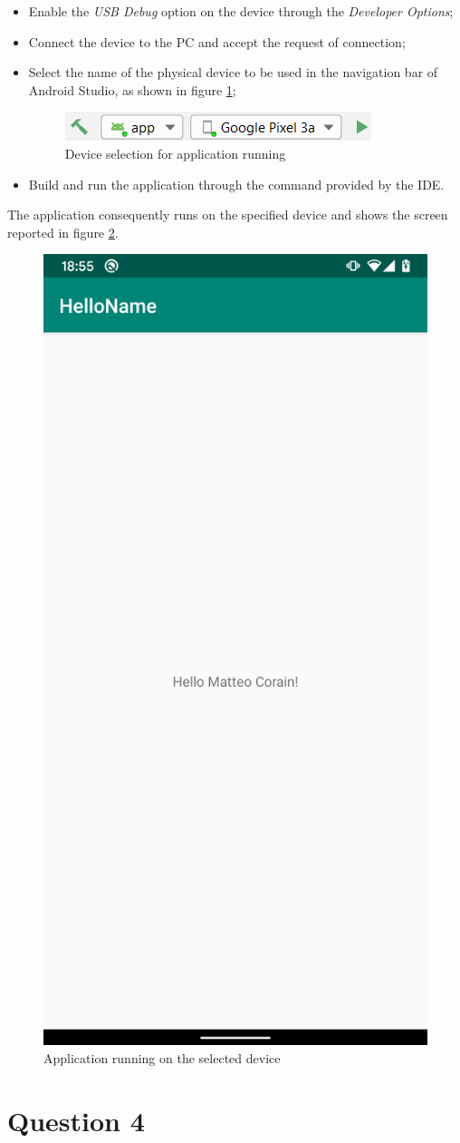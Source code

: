 \documentclass[letterpaper,headings=standardclasses]{scrartcl}
\begin{document}
\begin{itemize}

\item Enable the \emph{USB Debug} option on the device through the \emph{Developer Options};
\item Connect the device to the PC and accept the request of connection;
\item Select the name of the physical device to be used in the navigation bar of Android Studio, as shown in figure \ref{device_debug};

\begin{figure}[H]
  \centering
  \includegraphics[width=.4\linewidth]{03_device_debug.png}
  \caption{Device selection for application running}
  \label{device_debug}
\end{figure}

\item Build and run the application through the command provided by the IDE.

\end{itemize}

The application consequently runs on the specified device and shows the screen reported in figure \ref{device_run}.

\begin{figure}[H]
  \centering
  \includegraphics[width=.35\linewidth]{03_device_run.png}
  \caption{Application running on the selected device}
  \label{device_run}
\end{figure}

\section{Question 4}
\end{document}
